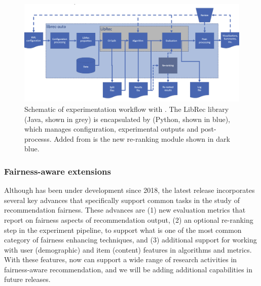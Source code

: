 \begin{figure}
    \centering
    \includegraphics[width=5.25in]{imgs/la/librec-auto-diagram2.png}
    \caption{Schematic of experimentation workflow with \libauto{}. The LibRec library (Java, shown in grey) is encapsulated by \libauto{} (Python, shown in blue), which manages configuration, experimental outputs and post-processs. Added from \cite{mansoury2018automating} is the new re-ranking module shown in dark blue.}
    \label{fig:librec-auto}
    \vspace{-0.15in}
\end{figure}

\subsubsection{\textbf{Fairness-aware extensions}}
\hfill

Although \libauto{} has been under development since 2018, the latest release incorporates several key advances that specifically support common tasks in the study of recommendation fairness. These advances are (1) new evaluation metrics that report on fairness aspects of recommendation output, (2) an optional re-ranking step in the experiment pipeline, to support what is one of the most common category of fairness enhancing techniques, and (3) additional support for working with user (demographic) and item (content) features in algorithms and metrics. With these features, \libauto{} now can support a wide range of research activities in fairness-aware recommendation, and we will be adding additional capabilities in future releases.

